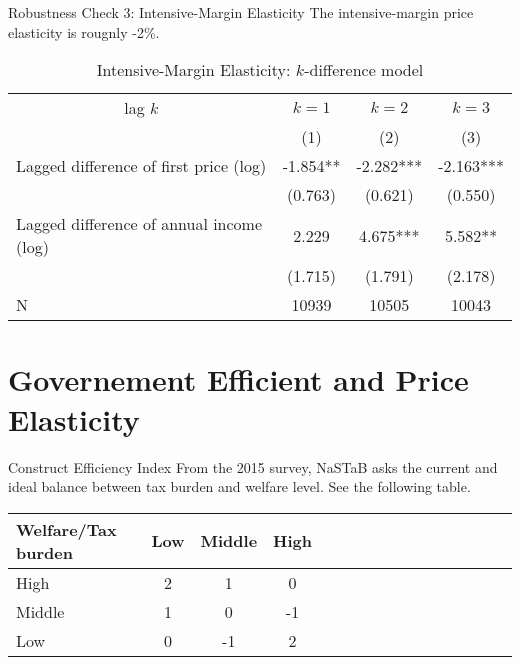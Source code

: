 \documentclass[
  ignorenonframetext,
]{beamer}
\begin{document}
\begin{frame}{Robustness Check 3: Intensive-Margin Elasticity}
\protect\hypertarget{robustness-check-3-intensive-margin-elasticity}{}
The intensive-margin price elasticity is rougnly -2\%.

\begin{table}

\caption{\label{tab:kablekDiffElasticitySlide2}Intensive-Margin Elasticity: $k$-difference model}
\centering
\fontsize{8}{10}\selectfont
\begin{tabular}[t]{lccc}
\toprule
\multicolumn{1}{c}{lag $k$} & \multicolumn{1}{c}{$k = 1$} & \multicolumn{1}{c}{$k = 2$} & \multicolumn{1}{c}{$k = 3$} \\
\cmidrule(l{3pt}r{3pt}){1-1} \cmidrule(l{3pt}r{3pt}){2-2} \cmidrule(l{3pt}r{3pt}){3-3} \cmidrule(l{3pt}r{3pt}){4-4}
 & (1) & (2) & (3)\\
\midrule
Lagged difference of first price (log) & -1.854** & -2.282*** & -2.163***\\
 & (0.763) & (0.621) & (0.550)\\
Lagged difference of annual income (log) & 2.229 & 4.675*** & 5.582**\\
 & (1.715) & (1.791) & (2.178)\\
N & 10939 & 10505 & 10043\\
\bottomrule
\end{tabular}
\end{table}
\end{frame}

\hypertarget{governement-efficient-and-price-elasticity}{%
\section{Governement Efficient and Price Elasticity}\label{governement-efficient-and-price-elasticity}}

\begin{frame}{Construct Efficiency Index}
\protect\hypertarget{construct-efficiency-index}{}
From the 2015 survey, NaSTaB asks the current and ideal balance between tax burden and welfare level.
See the following table.

\begin{table}[H]
\centering\begingroup\fontsize{8}{10}\selectfont

\begin{tabular}{l|cccl|cccl|cccl|ccc}
\toprule
Welfare/Tax burden & Low & Middle & High\\
\midrule
High & 2 & 1 & 0\\
Middle & 1 & 0 & -1\\
Low & 0 & -1 & 2\\
\bottomrule
\end{tabular}
\endgroup{}
\end{table}
\end{frame}
\end{document}

